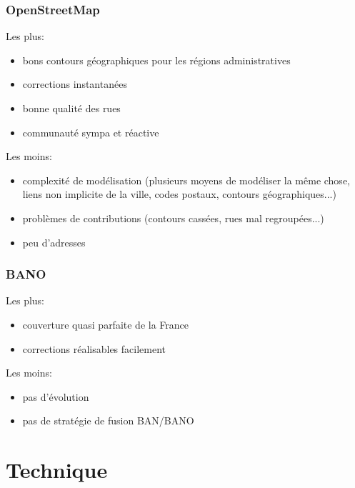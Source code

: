 \documentclass[table]{beamer}
\begin{document}
\begin{frame}
  \frametitle{OpenStreetMap}

  Les plus:
  \begin{itemize}
  \item bons contours géographiques pour les régions administratives
  \item corrections instantanées
  \item bonne qualité des rues
  \item communauté sympa et réactive
  \end{itemize}

  Les moins:
  \begin{itemize}
  \item complexité de modélisation (plusieurs moyens de modéliser la
    même chose, liens non implicite de la ville, codes postaux,
    contours géographiques...)
  \item problèmes de contributions (contours cassées, rues mal regroupées...)
  \item peu d'adresses
  \end{itemize}
\end{frame}

\begin{frame}
  \frametitle{BANO}

  Les plus:
  \begin{itemize}
  \item couverture quasi parfaite de la France
  \item corrections réalisables facilement
  \end{itemize}

  Les moins:
  \begin{itemize}
  \item pas d'évolution
  \item pas de stratégie de fusion BAN/BANO
  \end{itemize}
\end{frame}

\section{Technique}
\end{document}
